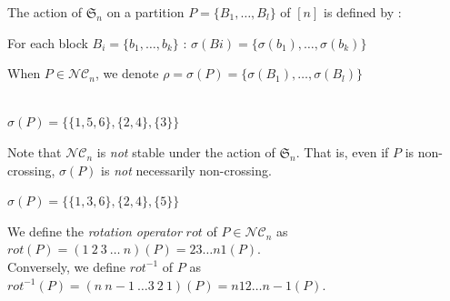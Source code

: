 \begin{definition}
    The action of $\mathfrak{S}_n$ on a partition
    $P = \{B_1, \ldots, B_l\}$ of $[n]$ is defined by :\\
    \begin{itemize*}
        \item For each block $B_i = \{b_1, \ldots, b_k\}$ :
        $\sigma(Bi) =\{\sigma (b_1), \ldots, \sigma (b_k)\}$ \\
        \item When $P \in \mathcal{NC}_n$, we denote 
        $\rho = \sigma(P) =
            \{\sigma (B_1), \ldots, \sigma (B_l)\}$
    \end{itemize*}
\end{definition}

\begin{example}[$\sigma = 415362,
    P = \{\{1, 6\}, \{2, 3, 5\}, \{4\}\}$]
    ~\\
    $\sigma (P) = 
        \{\{1, 5, 6\}, \{2, 4\}, \{3\}\}$
        ~\\
    \begin{center}
        
        
    \end{center}
\end{example}

\begin{rem}
    Note that $\mathcal{NC}_n$ is \emph{not} stable under
    the action of $\mathfrak{S}_n$.
    That is, even if $P$ is non-crossing, $\sigma (P)$ is 
    \emph{not} necessarily non-crossing.
\end{rem}

\begin{example}[Counter-example : $\sigma = 413562,
    P = \{\{1, 6\}, \{2, 3, 5\}, \{4\}\}$]
    $\sigma (P) = 
        \{\{1, 3, 6\}, \{2, 4\}, \{5\}\}$
        ~\\
    \begin{center}
        
        
    \end{center}
\end{example}

\begin{definition}[Rotation]
    We define the \emph{rotation operator} $rot$ of
    $P \in \mathcal{NC}_n$ as $rot (P) = 
    (1\ 2\ 3\  \ldots \ n)(P) = 23 \ldots n1 (P)$.\\
    Conversely, we define $rot^{-1}$ of $P$ as
    $rot^{-1}(P) = (n\ n-1\ \ldots 3\ 2\ 1)(P) = 
    n12 \ldots n-1 (P)$.
\end{definition}

